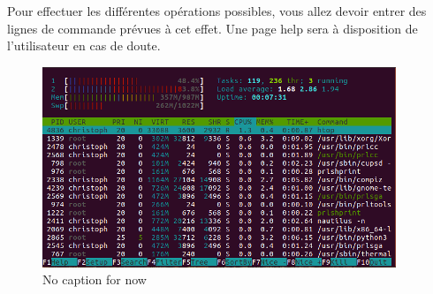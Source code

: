 Pour effectuer les différentes opérations possibles, vous allez devoir entrer des lignes de commande prévues à cet effet. Une page help sera à disposition de l'utilisateur en cas de doute. 

\begin{figure}
\begin{center}
\includegraphics{images/htop.png}
\end{center}
\caption{No caption for now }
\label{example}
\end{figure}


